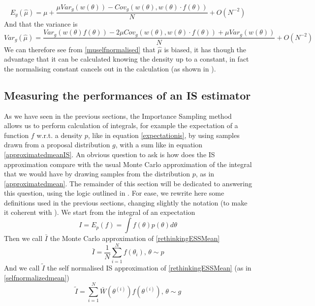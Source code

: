 \documentclass[12pt,mythesisstyle]{report}
\begin{document}
\begin{equation}\label{muselfnormalised}
E_g(\hat{\mu})=\mu+\frac{\mu Var_g(w(\theta))−Cov_g(w(\theta),w(\theta)·f(\theta))}{N} +O(N^{−2})
\end{equation}
And that the variance is
\begin{equation}
Var_g(\hat{\mu})=\frac{Var_g(w(\theta)f(\theta)) − 2\mu Cov_g( w (\theta ) , w ( \theta ) · f (\theta ) )+\mu Var_g(w(\theta))}{N} +O(N^{−2})
\end{equation}
We can therefore see from \eqref{muselfnormalised} that $\hat{\mu}$ is biased, it has though the advantage that it can be calculated knowing the density up to a constant, in fact the normalising constant cancels out in the calculation (as shown in \cite{mcmcnotes}).

\subsection{Measuring the performances of an IS estimator}
As we have seen in the previous sections, the Importance Sampling method allows us to perform calculation of integrals, for example the expectation of a function $f$ w.r.t. a density $p$, like in equation \eqref{expectationis}, by using samples drawn from a proposal distribution $g$, with a sum like in equation \eqref{approximatedmeanIS}. An obvious question to ask is how does the IS approximation compare with the usual Monte Carlo approximation \cite{Kong1} \cite{Kong2} of the integral that we would have by drawing samples from the distribution $p$, as in \eqref{approximatedmean}. The remainder of this section will be dedicated to answering this question, using the logic outlined in \cite{RethinkingESS}.
For ease, we rewrite here some definitions used in the previous sections, changing slightly the notation (to make it coherent with \cite{RethinkingESS}). We start from the integral of an expectation 
\begin{equation}\label{rethinkingESSMean}
I=E_p(f)=\int f(\theta)p(\theta) d\theta
\end{equation}
Then we call $\bar{I}$ the Monte Carlo approximation of \eqref{rethinkingESSMean}
\begin{equation}\label{RethinkingbarI}
\bar{I}=\frac{1}{N}\sum_{i=1}^{N}f(\theta_i)\text{, } \theta \sim p
\end{equation}
And we call $\tilde{I}$ the self normalised IS approximation of \eqref{rethinkingESSMean} (as in \eqref{selfnormalizedmean})
\begin{equation}\label{rethinkingtildeI}
\tilde{I}=\sum_{i=1}^{N}\bar{W}(\theta^{(i)})f(\theta^{(i)})\text{, } \theta \sim g
\end{equation}
\end{document}
